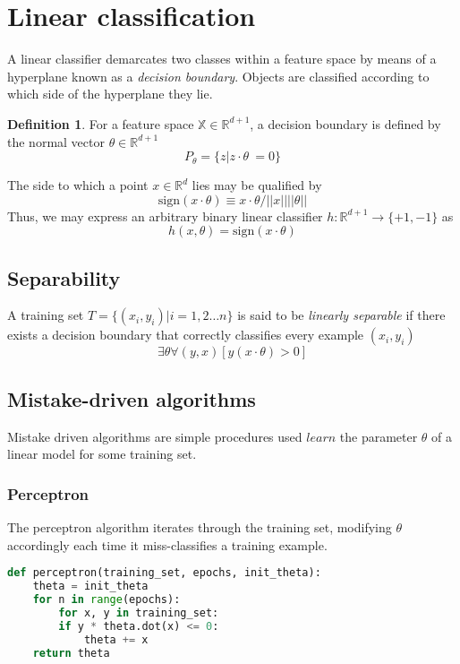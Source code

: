 \documentclass{article}
\theoremstyle{definition}
\newtheorem{definition}{Definition}[section]
\theoremstyle{remark}
\begin{document}
\section{Linear classification}
A linear classifier demarcates two classes within a feature space by means of a hyperplane known as a \textit{decision boundary}.  
Objects are classified according to which side of the hyperplane they lie. 
\begin{definition}
For a feature space $\mathbb{X} \in \mathbb{R}^{d+1}$, a decision boundary is defined by the normal vector $\theta \in \mathbb{R}^{d + 1}$
\begin{equation}
  P_{\theta} = \{ z | z \cdot \theta\ = 0\}  
  \label{eqn:hyperplane}
\end{equation}
\end{definition}

The side to which a point $x \in \mathbb{R}^{d}$ lies may be qualified by 
\begin{equation}
  \text{sign} (x\cdot\theta) \equiv x\cdot \theta / ||x|| ||\theta||
  \label{eqn:sideofplane}
\end{equation}
Thus, we may express an arbitrary binary linear classifier $h : \mathbb{R}^{d+1} \rightarrow \{+1, -1\} $ as
\begin{equation}
  h(x, \theta) = \text{sign}(x\cdot\theta)
  \label{eqn:linearclassifier}
\end{equation}
\subsection{Separability}
A training set $T = \{(x_{i}, y_{i})|i=1,2 \dots n\}$ is said to be \textit{linearly separable} if there exists a decision boundary that correctly classifies every example $(x_{i}, y_{i})$
\begin{equation}
  \exists\theta\forall (y, x)[y(x\cdot \theta) > 0]
  \label{eqn:linearlyseparable}
\end{equation}

\subsection{Mistake-driven algorithms}
Mistake driven algorithms are simple procedures used $learn$ the parameter $\theta$ of a linear model for some training set.

\subsubsection{Perceptron}
The perceptron algorithm iterates through the training set, modifying $\theta$ accordingly each time it miss-classifies a training example.
\begin{lstlisting}[language=Python]
def perceptron(training_set, epochs, init_theta):
    theta = init_theta
    for n in range(epochs):
        for x, y in training_set:
	    if y * theta.dot(x) <= 0:
	    	theta += x
    return theta
\end{lstlisting}
\end{document}
